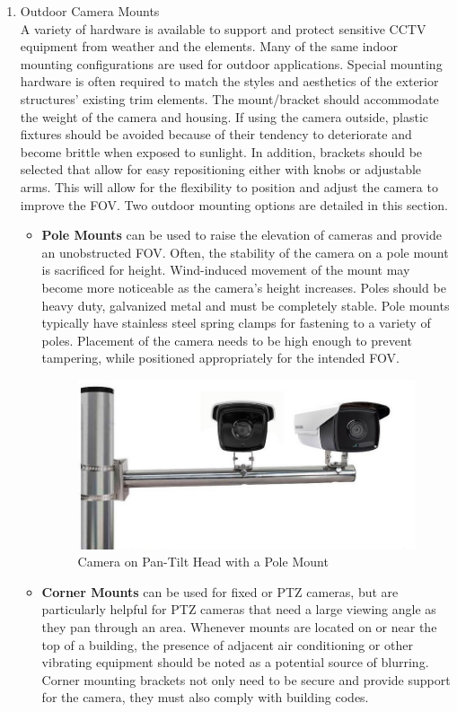 \documentclass[12pt,fleqn]{book} %
\begin{document}
\begin{enumerate}
    \item Outdoor Camera Mounts
    \\A variety of hardware is available to support and protect sensitive CCTV equipment from weather and the elements. Many of the same indoor mounting configurations are used for outdoor applications. Special mounting hardware is often required to match the styles and aesthetics of the exterior structures’ existing trim elements. The mount/bracket should accommodate the weight of the camera and housing. If using the camera outside, plastic fixtures should be avoided because of their tendency to deteriorate and become brittle when exposed to sunlight. In addition, brackets should be selected that allow for easy repositioning either with knobs or adjustable arms. This will allow for the flexibility to position and adjust the camera to improve the FOV. Two outdoor mounting options are detailed in this section.
    \begin{itemize}
        \item \textbf{Pole Mounts} can be used to raise the elevation of cameras and provide an unobstructed FOV. Often, the stability of the camera on a pole mount is sacrificed for height. Wind-induced movement of the mount may become more noticeable as the camera’s height increases. Poles should be heavy duty, galvanized metal and must be completely stable. Pole mounts typically have stainless steel spring clamps for fastening to a variety of poles. Placement of the camera needs to be high enough to prevent tampering, while positioned appropriately for the intended FOV.
                          \begin{figure}[!h]
    \centering
    \includegraphics[width=0.5\linewidth]{c 11.jpg}
    \caption{Camera on Pan-Tilt Head with a Pole Mount}
    \label{fig:c 11}
    \end{figure}
        \item \textbf{Corner Mounts }can be used for fixed or PTZ cameras, but are particularly helpful for PTZ cameras that need a large viewing angle as they pan through an area. Whenever mounts are located on or near the top of a building, the presence of adjacent air conditioning or other vibrating equipment should be noted as a potential source of blurring. Corner mounting brackets not only need to be secure and provide support for the camera, they must also comply with building codes. 
    \end{itemize}
\end{enumerate}
\end{document}
